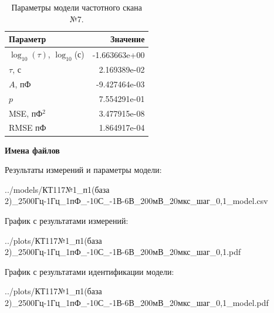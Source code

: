 \begin{table}[!ht]
    \centering
    \caption{Параметры модели частотного скана №7.}
    \begin{tabular}{|l|r|}
        \hline
        Параметр                                       & Значение                  \\ \hline
        $\log_{10}(\tau)$, $\log_{10}$(с)              & -1.663663e+00             \\ \hline
        $\tau$, с                                      & 2.169389e-02              \\ \hline
        $A$, пФ                                        & -9.427464e-03             \\ \hline
        $p$                                            & 7.554291e-01              \\ \hline
        MSE, пФ$^2$                                    & 3.477915e-08              \\ \hline
        RMSE пФ                                        & 1.864917e-04              \\ \hline
    \end{tabular}
    \label{table:frequency_scan_model_7}
\end{table}

\textbf{Имена файлов}

Результаты измерений и параметры модели:

\scriptsize../models/КТ117№1\_п1(база 2)\_2500Гц-1Гц\_1пФ\_-10С\_-1В-6В\_200мВ\_20мкс\_шаг\_0,1\_model.csv
\normalsize

График с результатами измерений:

\scriptsize../plots/КТ117№1\_п1(база 2)\_2500Гц-1Гц\_1пФ\_-10С\_-1В-6В\_200мВ\_20мкс\_шаг\_0,1.pdf
\normalsize

График с результатами идентификации модели:

\scriptsize../plots/КТ117№1\_п1(база 2)\_2500Гц-1Гц\_1пФ\_-10С\_-1В-6В\_200мВ\_20мкс\_шаг\_0,1\_model.pdf
\normalsize

